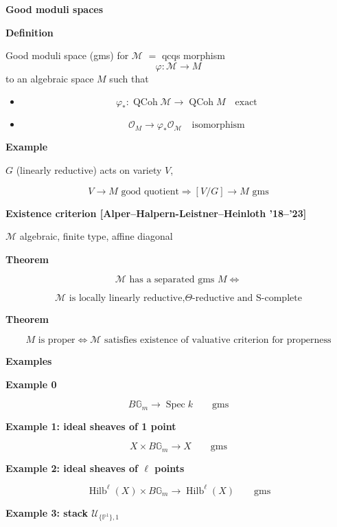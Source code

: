 \medskip\noindent
{\bf Good moduli spaces}

\medskip\noindent
{\bf Definition}

Good moduli space (gms) for $\mathcal M$
$=$ qcqs morphism
$$
\varphi\colon\mathcal M\longrightarrow M
$$
to an algebraic space $M$ such that
\begin{itemize}
\item
$$
\varphi_*\colon
\operatorname{QCoh}\mathcal M
\longrightarrow
\operatorname{QCoh}M
\quad\text{exact}
$$

\item
$$
\mathcal O_M
\longrightarrow
\varphi_*\mathcal O_{\mathcal M}
\quad\text{isomorphism}
$$
\end{itemize}

\medskip\noindent
{\bf Example}

$G$ (linearly reductive) acts on variety
$V$,

$$
V\longrightarrow M
\text{ good quotient}
\Longrightarrow
[V/G]\longrightarrow M
\text{ gms}
$$

\medskip\noindent
{\bf Existence criterion
[Alper--Halpern-Leistner--Heinloth
'18--'23]}

$\mathcal M$ algebraic, finite type,
affine diagonal

\medskip\noindent
{\bf Theorem}

$$
\mathcal M
\text{ has a separated gms }M
\Longleftrightarrow
$$

$$
\mathcal M
\text{ is locally linearly reductive,
$\Theta$-reductive and S-complete}
$$

\medskip\noindent
{\bf Theorem}

$$
M\text{ is proper}
\Longleftrightarrow
\mathcal M
\text{ satisfies existence of valuative
criterion for properness}
$$

\medskip\noindent
{\bf Examples}

\medskip\noindent
{\bf Example 0}

$$
B\mathbb G_m
\longrightarrow
\operatorname{Spec}k
\qquad\text{gms}
$$

\medskip\noindent
{\bf Example 1: ideal sheaves of 1 point}

$$
X\times B\mathbb G_m
\longrightarrow
X
\qquad\text{gms}
$$

\medskip\noindent
{\bf Example 2: ideal sheaves of
$\ell$ points}

$$
\operatorname{Hilb}^{\ell}(X)
\times B\mathbb G_m
\longrightarrow
\operatorname{Hilb}^{\ell}(X)
\qquad\text{gms}
$$

\medskip\noindent
{\bf Example 3: stack
$\mathcal U_{\{\mathbb P^1\},1}$}

